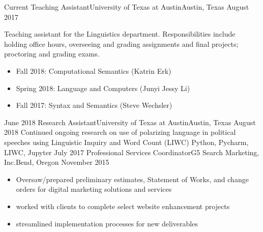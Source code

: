 %
%
%
\begin{experiences}
  \experience
    {Current}   {Teaching Assistant}{University of Texas at Austin}{Austin, Texas}
    {August 2017} { Teaching assistant for the Linguistics department. Responsibilities include holding office hours, overseeing and grading assignments and final projects; proctoring and grading exams.
                      \begin{itemize}
                        \item Fall 2018: Computational Semantics (Katrin Erk) 
                        \item Spring 2018: Language and Computers (Junyi Jessy Li)  
                        \item Fall 2017: Syntax and Semantics (Steve Wechsler)  
                      \end{itemize}
                    }
  \emptySeparator
  \experiencetech
    {June 2018} {Research Assistant}{University of Texas at Austin}{Austin, Texas}
    {August 2018}    { Continued ongoing research on use of polarizing language in political speeches using Linguistic Inquiry and Word Count (LIWC)  }
                    {Python, Pycharm, LIWC, Jupyter}
  \emptySeparator
  \experiencetech
    {July 2017}     {Professional Services Coordinator}{G5 Search Marketing, Inc.}{Bend, Oregon}
    {November 2015}    {
                      \begin{itemize}
                        \item Oversaw/prepared preliminary estimates, Statement of Works, and change orders for digital marketing solutions and services 
                        \item worked with clients to  complete select website enhancement projects 
                        \item streamlined implementation processes for new deliverables


\end{itemize}}
\end{experiences}
